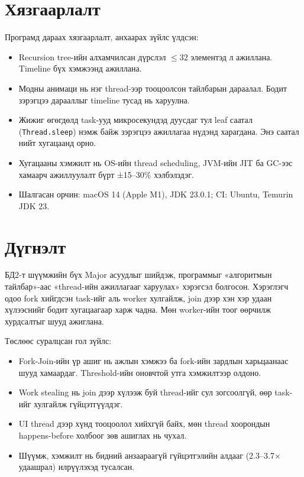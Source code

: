 \documentclass[11pt,a4paper]{article}
\begin{document}
\section{Хязгаарлалт}

Програмд дараах хязгаарлалт, анхаарах зүйлс үлдсэн:
\begin{itemize}
  \item Recursion tree-ийн алхамчилсан дүрслэл $\le 32$ элементэд л ажиллана. Timeline бүх хэмжээнд ажиллана.
  \item Модны анимаци нь нэг thread-ээр тооцоолсон тайлбарын дараалал. Бодит зэрэгцээ дарааллыг timeline тусад нь
        харуулна.
  \item Жижиг өгөгдөлд task-ууд микросекундэд дуусдаг тул leaf саатал (\texttt{Thread.sleep}) нэмж байж
        зэрэгцээ ажиллагаа нүдэнд харагдана. Энэ саатал нийт хугацаанд орно.
  \item Хугацааны хэмжилт нь OS-ийн thread scheduling, JVM-ийн JIT ба GC-ээс хамаарч ажиллуулалт бүрт ±15--30\%
        хэлбэлздэг.
  \item Шалгасан орчин: macOS 14 (Apple M1), JDK 23.0.1; CI: Ubuntu, Temurin JDK 23.
\end{itemize}

\section{Дүгнэлт}

БД2-т шүүмжийн бүх Major асуудлыг шийдэж, программыг «алгоритмын тайлбар»-аас «thread-ийн ажиллагааг харуулах»
хэрэгсэл болгосон. Хэрэглэгч одоо fork хийгдсэн task-ийг аль worker хулгайлж, join дээр хэн хэр удаан хүлээснийг
бодит хугацаагаар харж чадна. Мөн worker-ийн тоог өөрчилж хурдсалтыг шууд ажиглана.

Төслөөс суралцсан гол зүйлс:
\begin{itemize}
  \item Fork-Join-ийн үр ашиг нь ажлын хэмжээ ба fork-ийн зардлын харьцаанаас шууд хамаардаг. Threshold-ийн
        оновчтой утга хэмжилтээр олдоно.
  \item Work stealing нь join дээр хүлээж буй thread-ийг сул зогсоолгүй, өөр task-ийг хулгайлж гүйцэтгүүлдэг.
  \item UI thread дээр хүнд тооцоолол хийхгүй байх, мөн thread хоорондын happens-before холбоог зөв ашиглах нь
        чухал.
  \item Шүүмж, хэмжилт нь бидний анзаараагүй гүйцэтгэлийн алдааг (2.3--3.7× удаашрал) илрүүлэхэд тусалсан.
\end{itemize}
\end{document}
